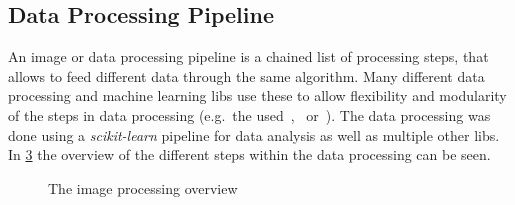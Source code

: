 \documentclass[12pt,a4paper, english]{article}
\begin{document}
    \subsection{Data Processing Pipeline}
      An image or data processing pipeline is a chained list of processing steps, that allows to feed different data through the same algorithm. 
      Many different data processing and machine learning \glspl{lib} use these to allow flexibility and modularity of the steps in data processing (e.g.\ the used~\cite{scikit-learn},~\cite{keras} or~\cite{gluon}). 
      The data processing was done using a \textit{scikit-learn} pipeline for data analysis as well as multiple other \glspl{lib}. 
      In \cref{fig:pipeline} the overview of the different steps within the data processing can be seen.
      \begin{figure}[!htbp]
         \begin{subfigure}[b]{0.40\textwidth}
           
           \label{fig:pipelineTraining}
         \end{subfigure}
         \begin{subfigure}[b]{0.40\textwidth}
           
           \label{fig:pipelineTrained}
         \end{subfigure}
         \caption{The image processing overview\label{fig:pipeline}}
       \end{figure}
  \newpage
\end{document}
